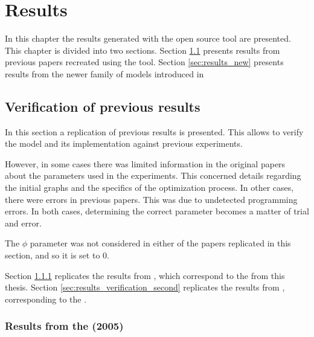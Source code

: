 \chapter{Results}
\label{cha:results}

In this chapter the results generated with the open source tool are presented.
This chapter is divided into two sections.
Section \ref{sec:results_verification} presents results from previous papers recreated using the tool.
Section \ref{sec:results_new} presents results from the newer family of models introduced in \cite{Ferrer2018a}

\section{Verification of previous results}
\label{sec:results_verification}

In this section a replication of previous results is presented.
This allows to verify the model and its implementation against previous experiments.

However, in some cases there was limited information in the original papers about the parameters used in the experiments.
This concerned details regarding the initial graphs and the specifics of the optimization process.
In other cases, there were errors in previous papers.
This was due to undetected programming errors.
In both cases, determining the correct parameter becomes a matter of trial and error.

The $\phi$ parameter was not considered in either of the papers replicated in this section, and so it is set to 0.

Section \ref{sec:results_verification_first} replicates the results from \cite{Ferrer2005a}, which correspond to the \firstmodel{} from this thesis.
Section \ref{sec:results_verification_second} replicates the results from \cite{Ferrer2003a}, corresponding to the \secondmodel{}.

\subsection{Results from the \firstmodel{} (2005)}
\label{sec:results_verification_first}

